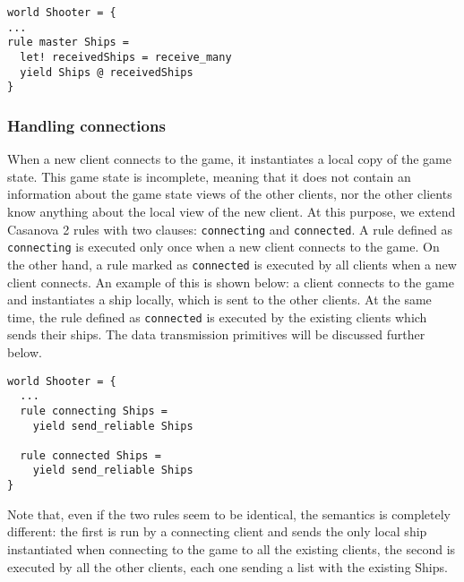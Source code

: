\begin{lstlisting}
world Shooter = {
...
rule master Ships =
  let! receivedShips = receive_many
  yield Ships @ receivedShips
}
\end{lstlisting}

\subsubsection{Handling connections}
When a new client connects to the game, it instantiates a local copy of the game state. This game state is incomplete, meaning that it does not contain an information about the game state views of the other clients, nor the other clients know anything about the local view of the new client. At this purpose, we extend Casanova 2 rules with two clauses: \texttt{connecting} and \texttt{connected}. A rule defined as \texttt{connecting} is executed only once when a new client connects to the game. On the other hand, a rule marked as \texttt{connected} is executed by all clients when a new client connects. An example of this is shown below: a client connects to the game and instantiates a ship locally, which is sent to the other clients. At the same time, the rule defined as \texttt{connected} is executed by the existing clients which sends their ships. The data transmission primitives will be discussed further below.

\begin{lstlisting}
world Shooter = {
  ...
  rule connecting Ships =
    yield send_reliable Ships
    
  rule connected Ships =
    yield send_reliable Ships
}
\end{lstlisting}

\noindent
Note that, even if the two rules seem to be identical, the semantics is completely different: the first is run by a connecting client and sends the only local ship instantiated when connecting to the game to all the existing clients, the second is executed by all the other clients, each one sending a list with the existing Ships.


